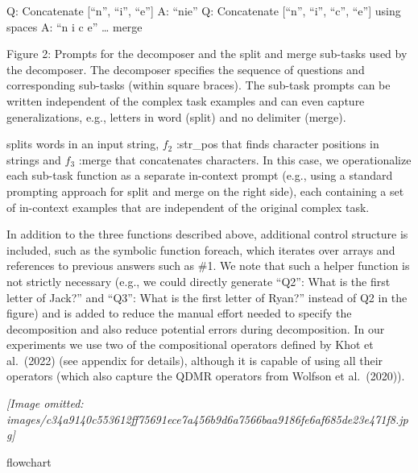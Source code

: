 \documentclass[
]{article}
\begin{document}
Q: Concatenate {[}``n'', ``i'', ``e''{]} A: ``nie'' Q: Concatenate
{[}``n'', ``i'', ``c'', ``e''{]} using spaces A: ``n i c e'' \ldots{}
merge

Figure 2: Prompts for the decomposer and the split and merge sub-tasks
used by the decomposer. The decomposer specifies the sequence of
questions and corresponding sub-tasks (within square braces). The
sub-task prompts can be written independent of the complex task examples
and can even capture generalizations, e.g., letters in word (split) and
no delimiter (merge).

splits words in an input string, \(f_{2}\) :str\_pos that finds
character positions in strings and \(f_{3}\) :merge that concatenates
characters. In this case, we operationalize each sub-task function as a
separate in-context prompt (e.g., using a standard prompting approach
for split and merge on the right side), each containing a set of
in-context examples that are independent of the original complex task.

In addition to the three functions described above, additional control
structure is included, such as the symbolic function foreach, which
iterates over arrays and references to previous answers such as \#1. We
note that such a helper function is not strictly necessary (e.g., we
could directly generate ``Q2'': What is the first letter of Jack?'' and
``Q3'': What is the first letter of Ryan?'' instead of Q2 in the figure)
and is added to reduce the manual effort needed to specify the
decomposition and also reduce potential errors during decomposition. In
our experiments we use two of the compositional operators defined by
Khot et al.~(2022) (see appendix for details), although it is capable of
using all their operators (which also capture the QDMR operators from
Wolfson et al.~(2020)).

\textit{[Image omitted: images/c34a9140c553612ff75691ece7a456b9d6a7566baa9186fe6af685de23e471f8.jpg]}

flowchart
\end{document}
